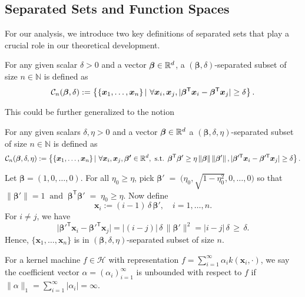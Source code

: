 \subsection{Separated Sets and Function Spaces}
For our analysis, we introduce two key definitions of separated sets that play a crucial role in our theoretical development.
\begin{definition}
For any given scalar $\delta > 0$ and a vector $\bm{\beta} \in \mathbb{R}^d$, a $(\bm{\beta}, \delta)$-separated subset of size $n \in \mathbb{N}$ is defined as  
$${\mathcal{C}}_n(\bm{\beta}, \delta) := \left\{\{\bm{x}_1,\ldots, \bm{x}_n\} \,|\, \, \forall \bm{x}_i,\bm{x}_j, |\bm{\beta}^{\mathsf{T}} \bm{x}_i - \bm{\beta}^{\mathsf{T}} \bm{x}_j| \ge \delta \right\}.$$    
\end{definition}
This could be further generalized to the notion
\begin{definition} For any given scalars $\delta, \eta > 0$ and a vector $\bm{\beta} \in \mathbb{R}^d$ a $(\bm{\beta}, \delta, \eta)$-separated subset of size $n \in \mathbb{N}$ is defined as 
    $${\mathcal{C}}_n(\bm{\beta}, \delta, \eta) := \left\{\{\bm{x}_1,\ldots, \bm{x}_n\} \,|\, \, \forall \bm{x}_i,\bm{x}_j, \bm{\beta'} \in \mathbb{R}^d, \text{ s.t. } \bm{\beta}^{\mathsf{T}}\bm{\beta}' \ge \eta \left\|\bm{\beta}\right\|\left\|\bm{\beta}'\right\|, |\bm{\beta}'^{\mathsf{T}} \bm{x}_i - \bm{\beta}'^{\mathsf{T}} \bm{x}_j| \ge \delta\right\}.$$    
\end{definition}

\begin{example}\label{exam: set}
Let $\bm{\beta} = (1,0,\dots,0)$. For all $\eta_0 \ge \eta$, pick $\bm{\beta}' 
  \;=\; 
  \bigl(\eta_0,\sqrt{1-\eta_0^2},0,\dots,0\bigr)$ 
  so that
  $\|\bm{\beta}'\|=1 
  \;\;\text{and}\;\; 
  \bm{\beta}^{\mathsf{T}} \bm{\beta}' \;=\; \eta_0 \ge \eta$. Now define 
\[
  \bm{x}_i := (i-1)\,\delta\,\bm{\beta}', 
  \quad i=1,\dots,n.
\]
For $i\neq j$, we have 
\[
  \bigl|\bm{\beta}'^{\mathsf{T}} \bm{x}_i 
        - \bm{\beta}'^{\mathsf{T}} \bm{x}_j\bigr|
  = |(i-j)|\,\delta\,\|\bm{\beta}'\|^2 
  = |i-j|\,\delta 
  \,\ge\, \delta.
\]
Hence, $\{\bm{x}_1,\dots,\bm{x}_n\}$ is in $(\bm{\beta},\delta,\eta)$-separated subset of size $n$.
\end{example}

\begin{definition}
For a kernel machine $f \in \mathcal{H}$ with representation $f = \sum_{i=1}^\infty \alpha_i k(\bm{x}_i,\cdot)$, we say the coefficient vector $\alpha = (\alpha_i)_{i=1}^\infty$ is unbounded with respect to $f$ if $\|\alpha\|_1 = \sum_{i=1}^\infty |\alpha_i| = \infty$.
\end{definition}

